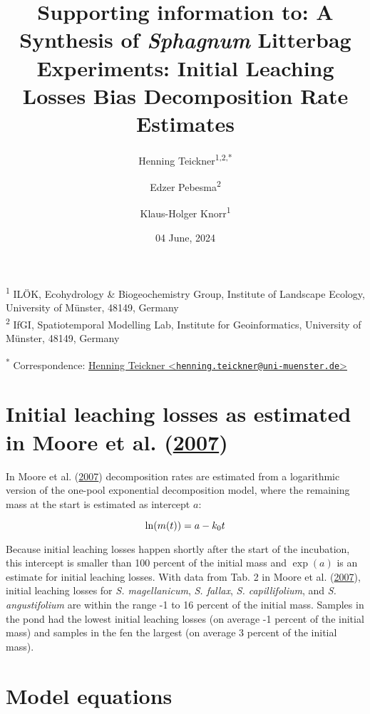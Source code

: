 \documentclass[
  12pt,
]{article}
\title{Supporting information to: A Synthesis of \emph{Sphagnum} Litterbag Experiments: Initial Leaching Losses Bias Decomposition Rate Estimates}
\author{Henning Teickner\textsuperscript{1,2,*} \and Edzer Pebesma\textsuperscript{2} \and Klaus-Holger Knorr\textsuperscript{1}}
\date{04 June, 2024}
\begin{document}
\maketitle

{
\setcounter{tocdepth}{2}
\tableofcontents
}
\textsuperscript{1} ILÖK, Ecohydrology \& Biogeochemistry Group, Institute of Landscape Ecology, University of Münster, 48149, Germany\\
\textsuperscript{2} IfGI, Spatiotemporal Modelling Lab, Institute for Geoinformatics, University of Münster, 48149, Germany

\textsuperscript{*} Correspondence: \href{mailto:henning.teickner@uni-muenster.de}{Henning Teickner \textless{}\href{mailto:henning.teickner@uni-muenster.de}{\nolinkurl{henning.teickner@uni-muenster.de}}\textgreater{}}

\renewcommand{\thefigure}{S\arabic{figure}} 
\renewcommand{\thetable}{S\arabic{table}}
\renewcommand{\thesection}{S\arabic{section}}
\renewcommand{\theequation}{S\arabic{equation}}

\hypertarget{sup-1}{%
\section{\texorpdfstring{Initial leaching losses as estimated in Moore et al. (\protect\hyperlink{ref-Moore.2007}{2007})}{Initial leaching losses as estimated in Moore et al. (2007)}}\label{sup-1}}

In Moore et al. (\protect\hyperlink{ref-Moore.2007}{2007}) decomposition rates are estimated from a logarithmic version of the one-pool exponential decomposition model, where the remaining mass at the start is estimated as intercept \(a\):

\[
\ln(m(t)) = a - k_0t\\
\]

Because initial leaching losses happen shortly after the start of the incubation, this intercept is smaller than 100 percent of the initial mass and \(\exp(a)\) is an estimate for initial leaching losses. With data from Tab. 2 in Moore et al. (\protect\hyperlink{ref-Moore.2007}{2007}), initial leaching losses for \emph{S. magellanicum}, \emph{S. fallax}, \emph{S. capillifolium}, and \emph{S. angustifolium} are within the range -1 to 16 percent of the initial mass. Samples in the pond had the lowest initial leaching losses (on average -1 percent of the initial mass) and samples in the fen the largest (on average 3 percent of the initial mass).

\hypertarget{sup-13}{%
\section{Model equations}\label{sup-13}}
\end{document}
